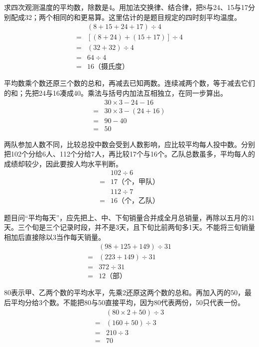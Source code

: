 \documentclass[multi=snippet,border=0pt]{standalone}
\newenvironment{snippet}[3]{\begin{minipage}{#1bp}\color{answerred}\fontsize{#2}{#3}\selectfont\raggedright}{\end{minipage}}
\begin{document}
\begin{snippet}{505}{11.5}{14}求四次观测温度的平均数，除数是4。用加法交换律、结合律，把8与24、15与17分别配成32；两个相同的和更易算。这里估计的是题目规定的四时刻平均温度。\[\begin{aligned}&(8+15+24+17)\div4\\={}&[(8+24)+(15+17)]\div4\\={}&(32+32)\div4\\={}&64\div4\\={}&16\text{（摄氏度）}\end{aligned}\]\end{snippet}
\begin{snippet}{505}{11.5}{14}平均数乘个数还原三个数的总和，再减去已知两数。连续减两个数，等于减去它们的和；先把24与16凑成40。乘法与括号内加法互相独立，在同一步算出。\[\begin{aligned}&30\times3-24-16\\={}&30\times3-(24+16)\\={}&90-40\\={}&50\end{aligned}\]\end{snippet}
\begin{snippet}{505}{11.5}{14}两队参加人数不同，比较总投中数会受到人数影响，应比较平均每人投中数。分别把102个分给6人、112个分给7人，再比较17个与16个。乙队总数虽多，平均每人的成绩却较少，因此要按人均水平判断。\[\begin{aligned}&102\div6\\={}&17\text{（个，甲队）}\\&112\div7\\={}&16\text{（个，乙队）}\end{aligned}\]\end{snippet}
\begin{snippet}{505}{11.5}{14}题目问“平均每天”，应先把上、中、下旬销量合并成全月总销量，再除以五月的31天。三个旬是三个记录时段，并不是3天，且下旬比前两旬多1天。不能将三旬销量相加后直接除以3当作每天销量。\[\begin{aligned}&(98+125+149)\div31\\={}&(223+149)\div31\\={}&372\div31\\={}&12\text{（部）}\end{aligned}\]\end{snippet}
\begin{snippet}{505}{11.5}{14}80表示甲、乙两个数的平均水平，先乘2还原这两个数的总和。再加入丙的50，最后平均分给3个数。不能把80与50直接平均，因为80代表两份，50只代表一份。\[\begin{aligned}&(80\times2+50)\div3\\={}&(160+50)\div3\\={}&210\div3\\={}&70\end{aligned}\]\end{snippet}
\end{document}
